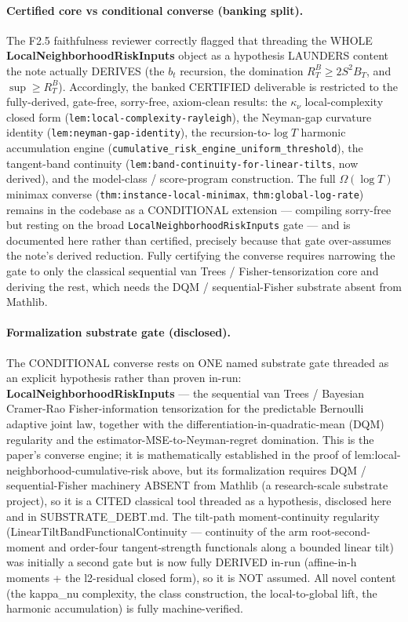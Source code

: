 \documentclass{article}
\begin{document}
\paragraph{Certified core vs conditional converse (banking split).} The F2.5 faithfulness reviewer correctly flagged that threading the WHOLE \textbf{LocalNeighborhoodRiskInputs} object as a hypothesis LAUNDERS content the note actually DERIVES (the $b_t$ recursion, the domination $R_T^B \ge 2S^2 B_T$, and $\sup \ge R_T^B$). Accordingly, the banked CERTIFIED deliverable is restricted to the fully-derived, gate-free, sorry-free, axiom-clean results: the $\kappa_\nu$ local-complexity closed form (\texttt{lem:local-complexity-rayleigh}), the Neyman-gap curvature identity (\texttt{lem:neyman-gap-identity}), the recursion-to-$\log T$ harmonic accumulation engine (\texttt{cumulative\_risk\_engine\_uniform\_threshold}), the tangent-band continuity (\texttt{lem:band-continuity-for-linear-tilts}, now derived), and the model-class / score-program construction. The full $\Omega(\log T)$ minimax converse (\texttt{thm:instance-local-minimax}, \texttt{thm:global-log-rate}) remains in the codebase as a CONDITIONAL extension --- compiling sorry-free but resting on the broad \texttt{LocalNeighborhoodRiskInputs} gate --- and is documented here rather than certified, precisely because that gate over-assumes the note's derived reduction. Fully certifying the converse requires narrowing the gate to only the classical sequential van Trees / Fisher-tensorization core and deriving the rest, which needs the DQM / sequential-Fisher substrate absent from Mathlib.

\paragraph{Formalization substrate gate (disclosed).} The CONDITIONAL converse rests on ONE named substrate gate threaded as an explicit hypothesis rather than proven in-run: \textbf{LocalNeighborhoodRiskInputs} --- the sequential van Trees / Bayesian Cramer-Rao Fisher-information tensorization for the predictable Bernoulli adaptive joint law, together with the differentiation-in-quadratic-mean (DQM) regularity and the estimator-MSE-to-Neyman-regret domination. This is the paper's converse engine; it is mathematically established in the proof of lem:local-neighborhood-cumulative-risk above, but its formalization requires DQM / sequential-Fisher machinery ABSENT from Mathlib (a research-scale substrate project), so it is a CITED classical tool threaded as a hypothesis, disclosed here and in SUBSTRATE\_DEBT.md. The tilt-path moment-continuity regularity (LinearTiltBandFunctionalContinuity --- continuity of the arm root-second-moment and order-four tangent-strength functionals along a bounded linear tilt) was initially a second gate but is now fully DERIVED in-run (affine-in-h moments + the l2-residual closed form), so it is NOT assumed. All novel content (the kappa\_nu complexity, the class construction, the local-to-global lift, the harmonic accumulation) is fully machine-verified.
\end{document}
